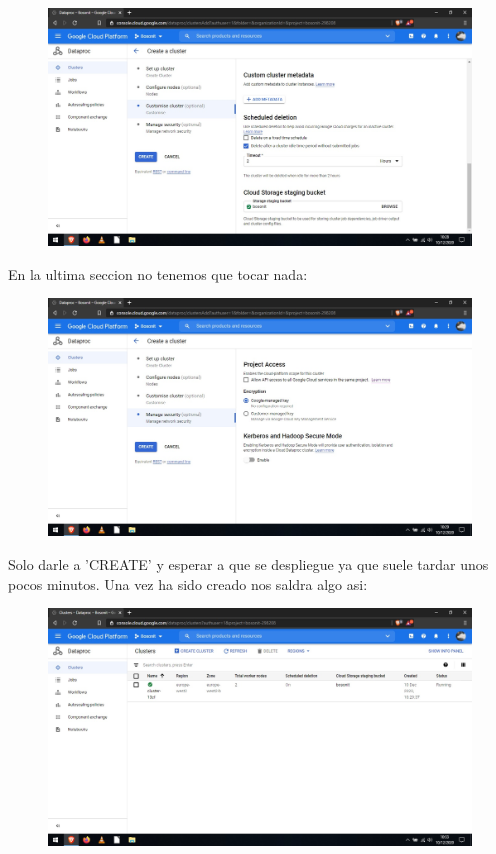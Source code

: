\documentclass[a4paper,10pt]{article}
\begin{document}
\begin{figure}[H]
\begin{center}
\includegraphics[width=500pt]{./fotos/GoogleCloud/33 - GC.jpg}
\end{center}
\end{figure}

En la ultima seccion no tenemos que tocar nada:

\begin{figure}[H]
\begin{center}
\includegraphics[width=500pt]{./fotos/GoogleCloud/34 - GC.jpg}
\end{center}
\end{figure}

Solo darle a 'CREATE' y esperar a que se despliegue ya que suele tardar unos pocos minutos. Una vez ha sido creado nos saldra algo asi:

\begin{figure}[H]
\begin{center}
\includegraphics[width=500pt]{./fotos/GoogleCloud/35 - GC.jpg}
\end{center}
\end{figure}
\end{document}
